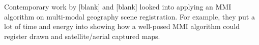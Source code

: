 %
%
%
%
%
%

%
%
%



Contemporary work by [blank] and [blank] \cite{} looked into applying an MMI algorithm on multi-modal geography scene registration. For example, they put a lot of time and energy into showing how a well-posed MMI algorithm could register drawn and satellite/aerial captured maps.




